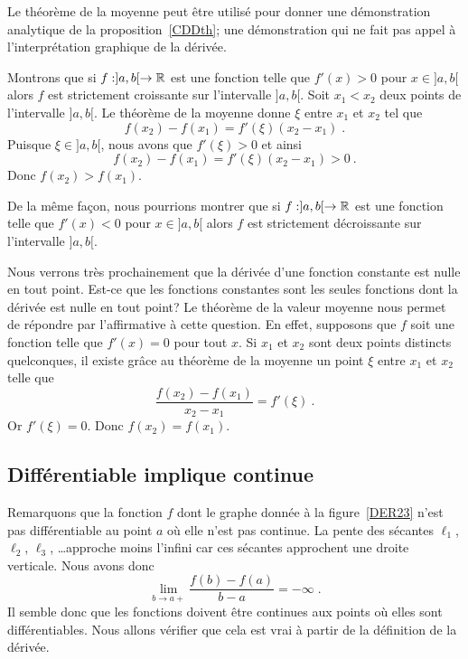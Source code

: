 {\begin{rmk}[\theory]
Le théorème de la moyenne peut être utilisé pour donner une
démonstration analytique de la proposition~\ref{CDDth}; une
démonstration qui ne fait pas appel à l'interprétation graphique de la
dérivée.

Montrons que si $f:]a,b[\rightarrow \mathbb{R}$ est une fonction telle que
$f'(x)>0$ pour $x\in]a,b[$ alors $f$ est strictement croissante sur
l'intervalle $]a,b[$.  Soit $x_1 < x_2$ deux points de l'intervalle
$]a,b[$.  Le théorème de la moyenne donne $\xi$ entre $x_1$ et $x_2$
tel que
\[
f(x_2)-f(x_1) = f'(\xi)(x_2-x_1) \; .
\]
Puisque $\xi \in ]a,b[$, nous avons que $f'(\xi)>0$ et ainsi
\[
f(x_2)-f(x_1) = f'(\xi)(x_2-x_1) >0 \ .
\]
Donc $f(x_2) > f(x_1)$.

De la même façon, nous pourrions montrer que si $f:]a,b[\rightarrow \mathbb{R}$
est une fonction telle que $f'(x)<0$ pour $x\in]a,b[$ alors $f$ est
strictement décroissante sur l'intervalle $]a,b[$.
\end{rmk}

Nous verrons très prochainement que la dérivée d'une fonction constante
est nulle en tout point.  Est-ce que les fonctions constantes sont les
seules fonctions dont la dérivée est nulle en tout point?  Le théorème
de la valeur moyenne nous permet de répondre par l'affirmative à cette
question.  En effet, supposons que $f$ soit une fonction telle que
$f'(x) = 0$ pour tout $x$.  Si $x_1$ et $x_2$ sont deux points
distincts quelconques, il existe grâce au théorème de la moyenne un
point $\xi$ entre $x_1$ et $x_2$ telle que
\[
\frac{f(x_2)-f(x_1)}{x_2-x_1} = f'(\xi) \ .
\]
Or $f'(\xi)=0$.  Donc $f(x_2)=f(x_1)$.

\subsection{Différentiable implique continue}

Remarquons que la fonction $f$ dont le graphe donnée à la
figure~\ref{DER23} n'est pas différentiable au point $a$ où elle n'est
pas continue.  La pente
des sécantes $\ell_1$, $\ell_2$, $\ell_3$, \ldots approche moins
l'infini car ces sécantes approchent une droite verticale.  Nous avons donc
\[
\lim_{b\rightarrow a+} \frac{f(b)-f(a)}{b-a} = -\infty \; .
\]
Il semble donc que les fonctions doivent être continues aux points où
elles sont différentiables.  Nous allons vérifier que cela est vrai à
partir de la définition de la dérivée.


}
